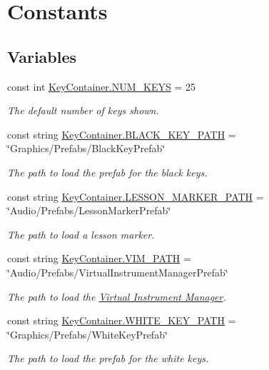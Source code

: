 \hypertarget{group___key_contain_const}{}\section{Constants}
\label{group___key_contain_const}
\subsection*{Variables}
\begin{DoxyCompactItemize}
\item 
const int \hyperlink{group___key_contain_const_gaa8fe6473e6396976e52c5793f027380e}{Key\+Container.\+N\+U\+M\+\_\+\+K\+E\+YS} = 25
\begin{DoxyCompactList}\small\item\em The default number of keys shown. \end{DoxyCompactList}\item 
const string \hyperlink{group___key_contain_const_gac968b0d398c545a13abad255d8287825}{Key\+Container.\+B\+L\+A\+C\+K\+\_\+\+K\+E\+Y\+\_\+\+P\+A\+TH} = \char`\"{}Graphics/Prefabs/Black\+Key\+Prefab\char`\"{}
\begin{DoxyCompactList}\small\item\em The path to load the prefab for the black keys. \end{DoxyCompactList}\item 
const string \hyperlink{group___key_contain_const_ga4caccd17bb57caca66047951046aa44a}{Key\+Container.\+L\+E\+S\+S\+O\+N\+\_\+\+M\+A\+R\+K\+E\+R\+\_\+\+P\+A\+TH} = \char`\"{}Audio/Prefabs/Lesson\+Marker\+Prefab\char`\"{}
\begin{DoxyCompactList}\small\item\em The path to load a lesson marker. \end{DoxyCompactList}\item 
const string \hyperlink{group___key_contain_const_ga8dc749271ab095b5759129459bcb647a}{Key\+Container.\+V\+I\+M\+\_\+\+P\+A\+TH} = \char`\"{}Audio/Prefabs/Virtual\+Instrument\+Manager\+Prefab\char`\"{}
\begin{DoxyCompactList}\small\item\em The path to load the \hyperlink{group___v_i_m}{Virtual Instrument Manager}. \end{DoxyCompactList}\item 
const string \hyperlink{group___key_contain_const_ga8ce7e53d5c067095ee26b96fcc522584}{Key\+Container.\+W\+H\+I\+T\+E\+\_\+\+K\+E\+Y\+\_\+\+P\+A\+TH} = \char`\"{}Graphics/Prefabs/White\+Key\+Prefab\char`\"{}
\begin{DoxyCompactList}\small\item\em The path to load the prefab for the white keys. \end{DoxyCompactList}\end{DoxyCompactItemize}


